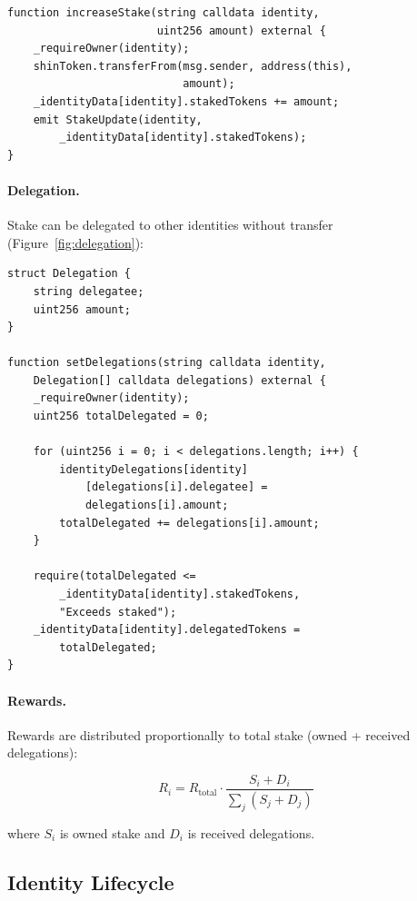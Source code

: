 \begin{lstlisting}[language=Solidity]
function increaseStake(string calldata identity,
                       uint256 amount) external {
    _requireOwner(identity);
    shinToken.transferFrom(msg.sender, address(this),
                           amount);
    _identityData[identity].stakedTokens += amount;
    emit StakeUpdate(identity,
        _identityData[identity].stakedTokens);
}
\end{lstlisting}

\paragraph{Delegation.} Stake can be delegated to other identities without transfer (Figure~\ref{fig:delegation}):

\begin{lstlisting}[language=Solidity]
struct Delegation {
    string delegatee;
    uint256 amount;
}

function setDelegations(string calldata identity,
    Delegation[] calldata delegations) external {
    _requireOwner(identity);
    uint256 totalDelegated = 0;

    for (uint256 i = 0; i < delegations.length; i++) {
        identityDelegations[identity]
            [delegations[i].delegatee] =
            delegations[i].amount;
        totalDelegated += delegations[i].amount;
    }

    require(totalDelegated <=
        _identityData[identity].stakedTokens,
        "Exceeds staked");
    _identityData[identity].delegatedTokens =
        totalDelegated;
}
\end{lstlisting}

\paragraph{Rewards.} Rewards are distributed proportionally to total stake (owned + received delegations):

\begin{equation}
    R_i = R_{\text{total}} \cdot \frac{S_i + D_i}{\sum_j (S_j + D_j)}
\end{equation}

where $S_i$ is owned stake and $D_i$ is received delegations.

\subsection{Identity Lifecycle}

